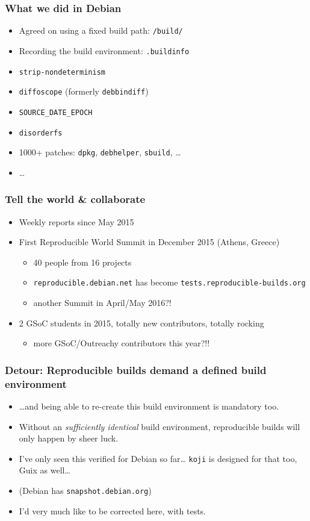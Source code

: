\documentclass[14pt]{beamer}
\begin{document}
\begin{frame}
 \frametitle{What we did in Debian}

 \begin{itemize}
  \item Agreed on using a fixed build path: \texttt{/build/}
  \item Recording the build environment: \texttt{.buildinfo}
  \item \texttt{strip-nondeterminism}
  \item \texttt{diffoscope} (formerly \texttt{debbindiff})
  \item \texttt{SOURCE\_DATE\_EPOCH}
  \item \texttt{disorderfs}
  \item 1000+ patches: \texttt{dpkg}, \texttt{debhelper}, \texttt{sbuild}, …
  \item …
 \end{itemize}
\end{frame}


\begin{frame}
 \frametitle{Tell the world \& collaborate}

 \begin{itemize}
  \item Weekly reports since May 2015
  \item<2-4> First Reproducible World Summit in December 2015 (Athens, Greece)
   \begin{itemize}
    \item<2-4> 40 people from 16 projects
    \item<2-4> \texttt{reproducible.debian.net} has become
  \texttt{tests.reproducible-builds.org}
  \item<3-4> another Summit in April/May 2016?!
   \end{itemize}
  \item<4> 2 GSoC students in 2015, totally new contributors, totally rocking
  \begin{itemize}
 \item<4> more GSoC/Outreachy contributors this year?!!
   \end{itemize}
 \end{itemize}
\end{frame}

\begin{frame}
 \frametitle{Detour: Reproducible builds demand a defined build environment}
 \begin{itemize}
  \item …and being able to re-create this build environment is mandatory too.
  \item Without an \textit{sufficiently identical} build environment, reproducible builds will only
  happen by sheer luck.
  \item<2>{I've only seen this verified for Debian so far… \texttt{koji}
  is designed for that too, Guix as well…}
  \item<2> {(Debian has \texttt{snapshot.debian.org})}
\item<2> {I'd very much like to be corrected here, with tests.}
 \end{itemize}
\end{frame}
\end{document}
